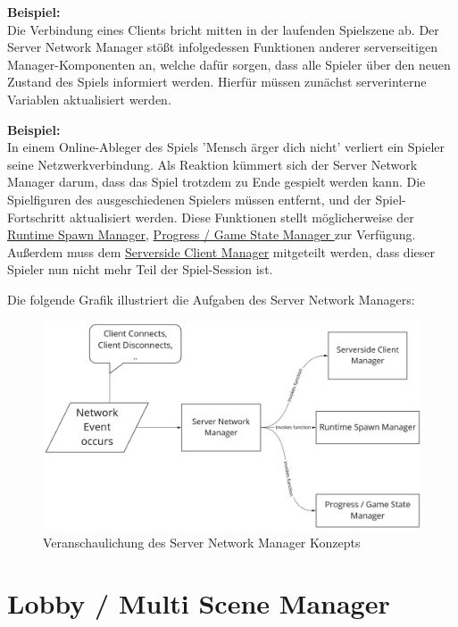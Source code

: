 \textbf{Beispiel:} \\
Die Verbindung eines Clients bricht mitten in der laufenden Spielszene ab. Der Server Network Manager stößt infolgedessen Funktionen anderer serverseitigen Manager-Komponenten an, welche dafür sorgen, dass alle Spieler über den neuen Zustand des Spiels informiert werden. Hierfür müssen zunächst serverinterne Variablen aktualisiert werden.

\textbf{Beispiel:}  \\
In einem Online-Ableger des Spiels 'Mensch ärger dich nicht' verliert ein Spieler seine Netzwerkverbindung. Als Reaktion kümmert sich der Server Network Manager darum, dass das Spiel trotzdem zu Ende gespielt werden kann. Die Spielfiguren des ausgeschiedenen Spielers müssen entfernt, und der Spiel-Fortschritt aktualisiert werden. Diese Funktionen stellt möglicherweise der \hyperref[spawn_manager]{Runtime Spawn Manager}, \hyperref[progress_manager]{Progress / Game State Manager } zur Verfügung.
Außerdem muss dem \hyperref[serverside_client_manager]{Serverside Client Manager} mitgeteilt werden, dass dieser Spieler nun nicht mehr Teil der Spiel-Session ist.

Die folgende Grafik illustriert die Aufgaben des Server Network Managers:

\begin{figure}[H]
	\centering
	\includegraphics[width=150mm]{images/Server_Network_Manager.jpg}
	\caption[Server Network Manager Diagramm]{Veranschaulichung des Server Network Manager Konzepts}
	\label{pic:Server_Network_Manager}
\end{figure}

\section{Lobby / Multi Scene Manager}

